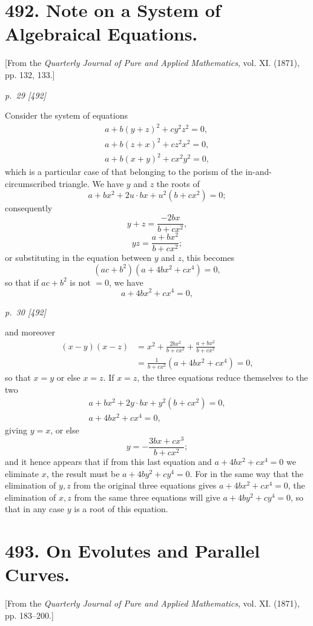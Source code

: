 ﻿\documentclass[11pt,a4paper]{article}
\theoremstyle{plain}
\theoremstyle{definition}
\begin{document}
\clearpage
\section*{492. Note on a System of Algebraical Equations.}
\begin{center}
\small [From the \textit{Quarterly Journal of Pure and Applied Mathematics},
vol. XI. (1871), pp. 132, 133.]
\end{center}

\textit{p.~29 [492]}

Consider the system of equations
\[
\begin{gathered}
a+b(y+z)^2+cy^2z^2=0,\\
a+b(z+x)^2+cz^2x^2=0,\\
a+b(x+y)^2+cx^2y^2=0,
\end{gathered}
\]
which is a particular case of that belonging to the porism of the
in-and-circumscribed triangle. We have \(y\) and \(z\) the roots of
\[
a+bx^2+2u\cdot bx+u^2(b+cx^2)=0;
\]
consequently
\[
y+z=\frac{-2bx}{b+cx^2},
\]
\[
yz=\frac{a+bx^2}{b+cx^2};
\]
or substituting in the equation between \(y\) and \(z\), this becomes
\[
(ac+b^2)(a+4bx^2+cx^4)=0,
\]
so that if \(ac+b^2\) is not \(=0\), we have
\[
a+4bx^2+cx^4=0,
\]

\clearpage
\textit{p.~30 [492]}

and moreover
\[
\begin{aligned}
(x-y)(x-z)
&=x^2+\frac{2bx^2}{b+cx^2}
  +\frac{a+bx^2}{b+cx^2}\\
&=\frac{1}{b+cx^2}(a+4bx^2+cx^4)=0,
\end{aligned}
\]
so that \(x=y\) or else \(x=z\). If \(x=z\), the three equations reduce
themselves to the two
\[
\begin{gathered}
a+bx^2+2y\cdot bx+y^2(b+cx^2)=0,\\
a+4bx^2+cx^4=0,
\end{gathered}
\]
giving \(y=x\), or else
\[
y=-\frac{3bx+cx^3}{b+cx^2};
\]
and it hence appears that if from this last equation and
\(a+4bx^2+cx^4=0\) we eliminate \(x\), the result must be
\(a+4by^2+cy^4=0\). For in the same way that the elimination of \(y,z\)
from the original three equations gives \(a+4bx^2+cx^4=0\), the elimination
of \(x,z\) from the same three equations will give \(a+4by^2+cy^4=0\), so
that in any case \(y\) is a root of this equation.

\clearpage
\section*{493. On Evolutes and Parallel Curves.}
\begin{center}
\small [From the \textit{Quarterly Journal of Pure and Applied Mathematics},
vol. XI. (1871), pp. 183--200.]
\end{center}
\end{document}

